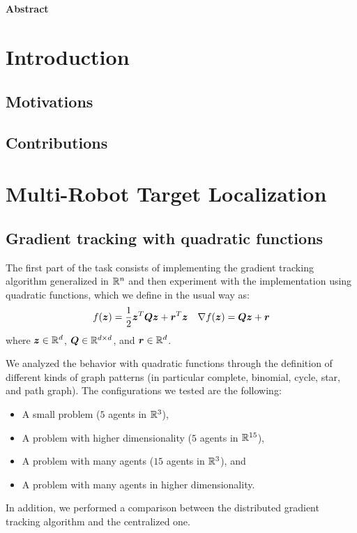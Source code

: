 \documentclass[a4paper,11pt,oneside]{book}
\begin{document}
\newpage
\thispagestyle{empty}

\begin{center}
\chapter*{}
\thispagestyle{empty}
{\Huge \textbf{Abstract}}\\
\vspace{15mm}
\end{center}

\tableofcontents \thispagestyle{empty}

\chapter*{Introduction}
\section*{Motivations} 

\section*{Contributions}


\chapter{Multi-Robot Target Localization}

\section{Gradient tracking with quadratic functions}

The first part of the task consists of implementing the gradient tracking algorithm generalized in ${\mathbb{R}}^n$ and then experiment with the implementation using quadratic functions, which we define in the usual way as:
\[
      f({\bm{z}}) = \frac{1}{2} {\bm{z}}^T {\bm{Q}} {\bm{z}} + {\bm{r}}^T {\bm{z}}
      \quad
      \nabla f({\bm{z}}) = {\bm{Q}} {\bm{z}} + {\bm{r}}
\]
where ${\bm{z}} \in {\mathbb{R}}^{d}$, ${\bm{Q}} \in {\mathbb{R}}^{d \times d}$, and ${\bm{r}} \in {\mathbb{R}}^{d}$.

We analyzed the behavior with quadratic functions through the definition of different kinds of graph patterns (in particular complete, binomial, cycle, star, and path graph). The configurations we tested are the following:
\begin{itemize}
      \item A small problem ($5$ agents in ${\mathbb{R}}^3$),
      \item A problem with higher dimensionality ($5$ agents in ${\mathbb{R}}^{15}$),
      \item A problem with many agents ($15$ agents in ${\mathbb{R}}^3$), and
      \item A problem with many agents in higher dimensionality.
\end{itemize}
In addition, we performed a comparison between the distributed gradient tracking algorithm and the centralized one.
\end{document}
